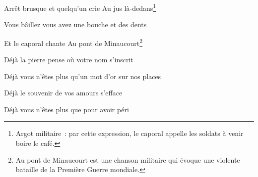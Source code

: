 {Arrêt brusque et quelqu'un crie Au jus là-dedans\footnote{Argot militaire~: par cette expression, le caporal appelle les soldats à venir boire le café.}

Vous bâillez vous avez une bouche et des dents

Et le caporal chante Au pont de Minaucourt\footnote{Au pont de Minaucourt est une chanson militaire qui évoque une violente bataille de la Première Guerre mondiale.}

\bigskip

Déjà la pierre pense où votre nom s'inscrit

Déjà vous n'êtes plus qu'un mot d'or sur nos places

Déjà le souvenir de vos amours s'efface

Déjà vous n'êtes plus que pour avoir péri
\setlength{\parskip}{6pt}

}


